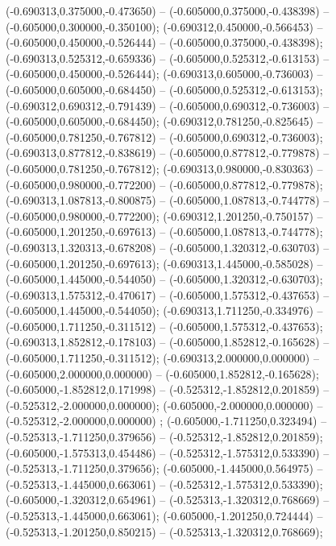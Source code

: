  (-0.690313,0.375000,-0.473650) -- (-0.605000,0.375000,-0.438398) -- (-0.605000,0.300000,-0.350100);
 (-0.690312,0.450000,-0.566453) -- (-0.605000,0.450000,-0.526444) -- (-0.605000,0.375000,-0.438398);
 (-0.690313,0.525312,-0.659336) -- (-0.605000,0.525312,-0.613153) -- (-0.605000,0.450000,-0.526444);
 (-0.690313,0.605000,-0.736003) -- (-0.605000,0.605000,-0.684450) -- (-0.605000,0.525312,-0.613153);
 (-0.690312,0.690312,-0.791439) -- (-0.605000,0.690312,-0.736003) -- (-0.605000,0.605000,-0.684450);
 (-0.690312,0.781250,-0.825645) -- (-0.605000,0.781250,-0.767812) -- (-0.605000,0.690312,-0.736003);
 (-0.690313,0.877812,-0.838619) -- (-0.605000,0.877812,-0.779878) -- (-0.605000,0.781250,-0.767812);
 (-0.690313,0.980000,-0.830363) -- (-0.605000,0.980000,-0.772200) -- (-0.605000,0.877812,-0.779878);
 (-0.690313,1.087813,-0.800875) -- (-0.605000,1.087813,-0.744778) -- (-0.605000,0.980000,-0.772200);
 (-0.690312,1.201250,-0.750157) -- (-0.605000,1.201250,-0.697613) -- (-0.605000,1.087813,-0.744778);
 (-0.690313,1.320313,-0.678208) -- (-0.605000,1.320312,-0.630703) -- (-0.605000,1.201250,-0.697613);
 (-0.690313,1.445000,-0.585028) -- (-0.605000,1.445000,-0.544050) -- (-0.605000,1.320312,-0.630703);
 (-0.690313,1.575312,-0.470617) -- (-0.605000,1.575312,-0.437653) -- (-0.605000,1.445000,-0.544050);
 (-0.690313,1.711250,-0.334976) -- (-0.605000,1.711250,-0.311512) -- (-0.605000,1.575312,-0.437653);
 (-0.690313,1.852812,-0.178103) -- (-0.605000,1.852812,-0.165628) -- (-0.605000,1.711250,-0.311512);
 (-0.690313,2.000000,0.000000) -- (-0.605000,2.000000,0.000000) -- (-0.605000,1.852812,-0.165628);
 (-0.605000,-1.852812,0.171998) -- (-0.525312,-1.852812,0.201859) -- (-0.525312,-2.000000,0.000000);
 (-0.605000,-2.000000,0.000000) -- (-0.525312,-2.000000,0.000000) ;
 (-0.605000,-1.711250,0.323494) -- (-0.525313,-1.711250,0.379656) -- (-0.525312,-1.852812,0.201859);
 (-0.605000,-1.575313,0.454486) -- (-0.525312,-1.575312,0.533390) -- (-0.525313,-1.711250,0.379656);
 (-0.605000,-1.445000,0.564975) -- (-0.525313,-1.445000,0.663061) -- (-0.525312,-1.575312,0.533390);
 (-0.605000,-1.320312,0.654961) -- (-0.525313,-1.320312,0.768669) -- (-0.525313,-1.445000,0.663061);
 (-0.605000,-1.201250,0.724444) -- (-0.525313,-1.201250,0.850215) -- (-0.525313,-1.320312,0.768669);
